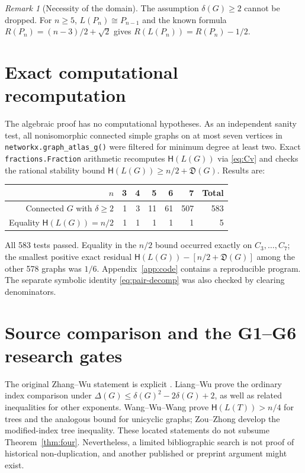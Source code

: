 \documentclass[11pt,a4paper]{article}
\theoremstyle{remark}
\newtheorem{remark}[theorem]{Remark}
\newcommand{\Def}{\mathfrak D}
\newcommand{\HH}{\mathsf H}
\begin{document}
\begin{remark}[Necessity of the domain]
The assumption $\delta(G)\ge2$ cannot be dropped. For $n\ge5$, $L(P_n)\cong P_{n-1}$ and the known formula $R(P_n)=(n-3)/2+\sqrt2$ gives $R(L(P_n))=R(P_n)-1/2$.
\end{remark}

\section{Exact computational recomputation}
The algebraic proof has no computational hypotheses. As an independent sanity test, all nonisomorphic connected simple graphs on at most seven vertices in \texttt{networkx.graph\_atlas\_g()} were filtered for minimum degree at least two. Exact \texttt{fractions.Fraction} arithmetic recomputes $\HH(L(G))$ via \eqref{eq:Cv} and checks the rational stability bound $\HH(L(G))\ge n/2+\Def(G)$. Results are:
\begin{center}
\begin{tabular}{rrrrrrr}\toprule
$n$ & 3 & 4 & 5 & 6 & 7 & Total \\\midrule
Connected $G$ with $\delta\ge2$ & 1 & 3 & 11 & 61 & 507 & 583 \\
Equality $\HH(L(G))=n/2$ & 1 & 1 & 1 & 1 & 1 & 5 \\\bottomrule
\end{tabular}
\end{center}
All 583 tests passed. Equality in the $n/2$ bound occurred exactly on $C_3,\ldots,C_7$; the smallest positive exact residual $\HH(L(G))-[n/2+\Def(G)]$ among the other 578 graphs was $1/6$. Appendix~\ref{app:code} contains a reproducible program. The separate symbolic identity \eqref{eq:pair-decomp} was also checked by clearing denominators.

\section{Source comparison and the G1--G6 research gates}
The original Zhang--Wu statement is explicit \cite{ZW22}. Liang--Wu \cite{LW23} prove the ordinary index comparison under $\Delta(G)\le\delta(G)^2-2\delta(G)+2$, as well as related inequalities for other exponents. Wang--Wu--Wang \cite{WWW23} prove $\HH(L(T))>n/4$ for trees and the analogous bound for unicyclic graphs; Zou--Zhong \cite{ZZ24} develop the modified-index tree inequality. These located statements do not subsume Theorem~\ref{thm:four}. Nevertheless, a limited bibliographic search is not proof of historical non-duplication, and another published or preprint argument might exist.
\end{document}
